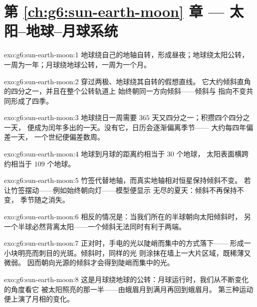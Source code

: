 \section*{第 \ref{ch:g6:sun-earth-moon} 章 --- 太阳--地球--月球系统}

\begin{solution}{exo:g6:sun-earth-moon:1}
地球绕自己的地轴自转，形成昼夜；地球绕太阳公转，
一周为一年；月球绕地球公转，一周为一个月。
\end{solution}

\begin{solution}{exo:g6:sun-earth-moon:2}
穿过两极、地球绕其自转的假想直线。
它大约倾斜直角的四分之一，并且在整个公转轨道上
始终朝同一方向倾斜——倾斜与
指向不变共同形成了四季。
\end{solution}

\begin{solution}{exo:g6:sun-earth-moon:3}
地球绕日一周需要 $365$ 天又四分之一；积攒四个四分之一天，
便成为闰年多出的一天。没有它，日历会逐渐偏离季节——
大约每四年偏差一天，
一个世纪便偏差数周。
\end{solution}

\begin{solution}{exo:g6:sun-earth-moon:4}
地球到月球的距离约相当于 $30$ 个地球，
太阳表面横跨约相当于 $109$ 个地球。
\end{solution}

\begin{solution}{exo:g6:sun-earth-moon:5}
竹签代替地轴，而真实地轴相对恒星保持倾斜不变。
若让竹签摆动——例如始终朝向灯——模型便显示
无尽的夏天：倾斜不再保持不变，
季节随之消失。
\end{solution}

\begin{solution}{exo:g6:sun-earth-moon:6}
相反的情况是：当我们所在的半球朝向太阳倾斜时，
另一个半球必然背离太阳——一个倾斜无法同时有利于两端。
\end{solution}

\begin{solution}{exo:g6:sun-earth-moon:7}
正对时，手电的光以陡峭而集中的方式落下——
形成一小块明亮而刺目的光斑。倾斜时，同样的光
则涂抹在墙上一大片区域，既稀薄又微弱。
因而朝向光源的倾斜才会得到陡峭而集中的光。
\end{solution}

\begin{solution}{exo:g6:sun-earth-moon:8}
这是月球绕地球的公转：月球运行时，我们从不断变化的角度看它
被太阳照亮的那一半——由蛾眉月到满月再回到蛾眉月。
第三种运动便上演了月相的变化。
\end{solution}

